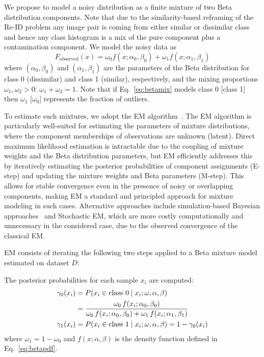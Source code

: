 \documentclass[lettersize,journal]{IEEEtran}
\begin{document}
We propose to model a noisy distribution as a finite mixture of two Beta distribution components. Note that due to the similarity-based reframing of the Re-ID problem any image pair is coming from either similar or dissimilar class and hence any class histogram is a mix of the pure component plus a contamination component. We model the noisy data as
\begin{equation}
    F_{\text{observed}}(x) = \omega_0 f(x; \alpha_0,\beta_0) + \omega_1f(x; \alpha_1,\beta_1)
    \label{eq:betamix}
\end{equation}
where $(\alpha_0, \beta_0)$ and $(\alpha_1, \beta_1)$ are the parameters of the Beta distribution for class 0 (dissimilar) and class 1 (similar), respectively, and the mixing proportions $\omega_1,\omega_2>0$: $\omega_1+\omega_2=1$. Note that if Eq.~\ref{eq:betamix} models class 0 [class 1] then $\omega_1$ [$\omega_0$] represents the fraction of outliers.

To estimate such mixtures, we adopt the EM algorithm~\cite{dempster1977maximum}. The EM algorithm is particularly well-suited for estimating the parameters of  mixture distributions, where the component memberships of observations are unknown (latent). Direct maximum likelihood estimation is intractable due to the coupling of mixture weights and the Beta distribution parameters, but EM efficiently addresses this by iteratively estimating the posterior probabilities of component assignments (E-step) and updating the mixture weights and Beta parameters (M-step). This allows for stable convergence even in the presence of noisy or overlapping components, making EM a standard and principled approach for mixture modeling in such cases. Alternative approaches include simulation-based Bayesian approaches~\cite{diebolt1994estimation} and Stochastic EM, which are more costly computationally and unnecessary in the considered case, due to the observed convergence of the classical EM.

EM consists of iterating the following two steps applied to a Beta mixture model estimated on dataset $D$:

The posterior probabilities for each sample $x_i$ are computed:
\begin{align}
\gamma_0(x_i) &= P(x_i \in \text{class } 0 \mid x_i; \omega, \alpha, \beta) \notag \\
 &= \frac{\omega_0 \, f(x_i; \alpha_0, \beta_0)}{\omega_0 \, f(x_i; \alpha_0, \beta_0) + \omega_1 \, f(x_i; \alpha_1, \beta_1)} \label{eq:postProb}\\
\gamma_1(x_i) &= P(x_i \in \text{class } 1 \mid x_i; \omega, \alpha, \beta) = 1 - \gamma_0(x_i) \notag
\end{align}
where $\omega_1 = 1-\omega_0$ and $f(x; \alpha, \beta)$ is the density function defined in Eq.~\ref{eq:betapdf}.
\end{document}
